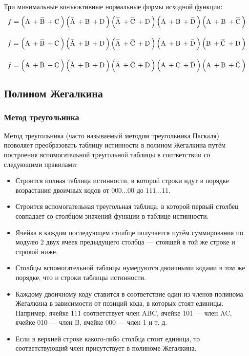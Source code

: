 \documentclass[a4paper, 14pt]{extarticle}
\begin{document}
Три минимальные конъюктивные нормальные формы исходной функции:
\begin{align*}
  f = \left(\NOV{A} + \OV{B} + \NOV{C}\right) \left(\OV{A} + \NOV{B} + \NOV{D}\right)
  \left(\OV{A} + \OV{C} + \NOV{D}\right) \left(\NOV{A} + \NOV{B} + \OV{D}\right)
  \left(\NOV{A} + \NOV{B} + \OV{C}\right) \\[1em]
  f = \left(\NOV{A} + \OV{B} + \NOV{C}\right) \left(\OV{A} + \NOV{B} + \NOV{D}\right)
  \left(\OV{A} + \OV{C} + \NOV{D}\right) \left(\NOV{A} + \NOV{B} + \OV{D}\right)
  \left(\NOV{B} + \OV{C} + \NOV{D}\right) \\[1em]
  f = \left(\NOV{A} + \OV{B} + \NOV{C}\right) \left(\OV{A} + \NOV{B} + \NOV{D}\right)
  \left(\OV{A} + \OV{C} + \NOV{D}\right) \left(\NOV{A} + \NOV{C} + \OV{D}\right)
  \left(\NOV{A} + \NOV{B} + \OV{C}\right) \\
\end{align*}


\subsection{Полином Жегалкина}

\subsubsection{Метод треугольника}

Метод треугольника (часто называемый методом треугольника Паскаля) 
позволяет преобразовать таблицу истинности в полином Жегалкина путём 
построения вспомогательной треугольной таблицы в соответствии со следующими правилами: 

\begin{itemize}
  \item Строится полная таблица истинности, в которой строки идут в порядке возрастания двоичных кодов от $000 ... 00$ до $111 ... 11$.
  \item Строится вспомогательная треугольная таблица, в которой первый столбец совпадает со столбцом значений функции в таблице истинности.
  \item Ячейка в каждом последующем столбце получается путём суммирования по модулю 2 двух ячеек предыдущего столбца — стоящей в той же строке и строкой ниже.
  \item Столбцы вспомогательной таблицы нумеруются двоичными кодами в том же порядке, что и строки таблицы истинности.
  \item Каждому двоичному коду ставится в соответствие один из членов полинома Жегалкина в зависимости от позиций кода, в которых стоят единицы. Например, ячейке 111 соответствует член ABC, ячейке 101 — член AC, ячейке 010 — член B, ячейке 000 — член 1 и т. д.
  \item Если в верхней строке какого-либо столбца стоит единица, то соответствующий член присутствует в полиноме Жегалкина.
\end{itemize}
\end{document}
